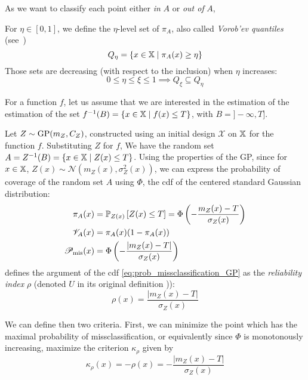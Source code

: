 \documentclass[../../Main_ManuscritThese.tex]{subfiles}
\begin{document}
As we want to classify each point either \emph{in} $A$ or \emph{out of} $A$, 

For $\eta \in [0, 1]$, we define the $\eta$-level set of $\pi_A$, also called \emph{Vorob'ev quantiles} (see~\cite{vorobyev_new_2003})
\begin{equation}
  Q_{\eta} = \{x\in\mathbb{X} \mid \pi_A(x) \geq \eta \}
\end{equation}
Those sets are decreasing (with respect to the inclusion) when $\eta$ increases:
\begin{equation}
  0\leq \eta \leq \xi \leq 1 \implies Q_{\xi} \subseteq Q_{\eta}
\end{equation}

For a function $f$, let us assume that we are interested in the estimation of the estimation of the set $f^{-1}(B) = \{x \in \mathbb{X} \mid f(x) \leq T\}$, with  $B = ]-\infty, T]$.

Let $Z \sim \operatorname{\mathrm{GP}}(m_Z, C_Z)$, constructed using an initial design $\mathcal{X}$ on $\mathbb{X}$ for the function $f$. Substituting $Z$ for $f$,
We have the random set $A = Z^{-1}(B) = \{x \in \mathbb{X} \mid Z(x) \leq T\}$.
Using the properties of the GP, since for $x\in\mathbb{X}$, $Z(x)\sim\mathcal{N}\left(m_Z(x), \sigma^2_Z(x)\right)$, we can express the probability of coverage of the random set $A$ using $\Phi$, the cdf of the centered standard Gaussian distribution:
\begin{align}
  \pi_A(x) &= \mathbb{P}_{Z(x)}\left[Z(x) \leq T\right] = \Phi\left(-\frac{m_Z(x) - T}{\sigma_Z(x)}\right) \\
  \mathscr{V}_A(x) &= \pi_A(x)(1 - \pi_A(x)) \\
  \mathscr{P}_{\mathrm{mis}}(x) &= \Phi\left(- \frac{\lvert m_Z(x) - T \rvert}{\sigma_Z(x)} \right) \label{eq:prob_missclassification_GP}
\end{align}
\cite{echard_ak-mcs_2011} defines the argument of the cdf \cref{eq:prob_missclassification_GP} as the \emph{reliability index} $\rho$ (denoted $U$ in its original definition \cite{echard_ak-mcs_2011})):
\begin{equation}
  \rho(x) = \frac{\lvert m_Z(x) - T \rvert}{\sigma_Z(x)}
\end{equation}

We can define then two criteria. First, we can minimize the point which has the maximal probability of missclassification, or equivalently since $\Phi$ is monotonously increasing, maximize the criterion $\kappa_{\rho}$ given by
\begin{equation}
  \kappa_{\rho}(x) = -\rho(x) = -\frac{\lvert m_Z(x) - T \rvert}{\sigma_Z(x)}
\end{equation}
\end{document}
